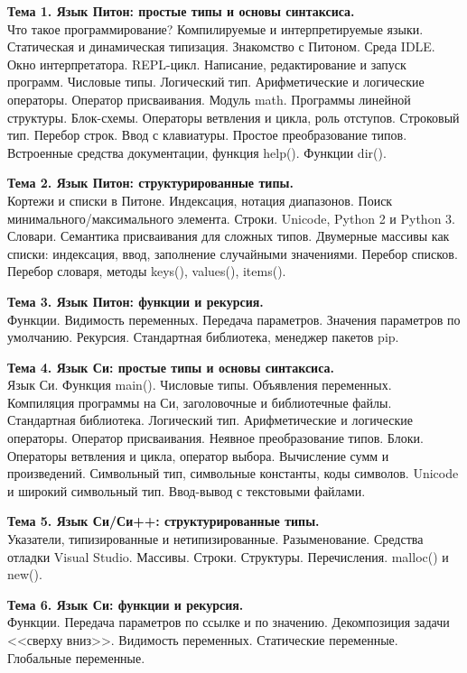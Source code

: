 \documentclass[a4paper,12pt]{article}
\begin{document}
\textbf{Тема 1. Язык Питон: простые типы и основы синтаксиса.}\\
Что такое программирование? Компилируемые и интерпретируемые языки. Статическая и динамическая типизация. Знакомство с Питоном. Среда IDLE. Окно интерпретатора. REPL-цикл. Написание, редактирование и запуск программ. Числовые типы. Логический тип. Арифметические и логические операторы. Оператор присваивания. Модуль math. Программы линейной структуры. Блок-схемы. Операторы ветвления и цикла, роль отступов. Строковый тип. Перебор строк. Ввод с клавиатуры. Простое преобразование типов. Встроенные средства документации, функция help(). Функции dir().

\textbf{Тема 2. Язык Питон: структурированные типы.          }\\
Кортежи и списки в Питоне. Индексация, нотация диапазонов. Поиск минимального/максимального элемента. Строки. Unicode, Python 2 и Python 3. Словари. Семантика присваивания для сложных типов. Двумерные массивы как списки: индексация, ввод, заполнение случайными значениями. Перебор списков. Перебор словаря, методы keys(), values(), items().

\textbf{Тема 3. Язык Питон: функции и рекурсия.	             }\\
Функции. Видимость переменных. Передача параметров. Значения параметров по умолчанию. Рекурсия. Стандартная библиотека, менеджер пакетов pip.

\textbf{Тема 4. Язык Си: простые типы и основы синтаксиса.   }\\
Язык Си. Функция main(). Числовые типы. Объявления переменных. Компиляция программы на Си, заголовочные и библиотечные файлы. Стандартная библиотека. Логический тип. Арифметические и логические операторы. Оператор присваивания. Неявное преобразование типов. Блоки. Операторы ветвления и цикла, оператор выбора. Вычисление сумм и произведений. Символьный тип, символьные константы, коды символов. Unicode и широкий символьный тип. Ввод-вывод с текстовыми файлами.

\textbf{Тема 5. Язык Си/Си++: структурированные типы.        }\\
Указатели, типизированные и нетипизированные. Разыменование. Средства отладки Visual Studio. Массивы. Строки. Структуры. Перечисления. malloc() и new().

\textbf{Тема 6. Язык Си: функции и рекурсия.	             }\\
Функции. Передача параметров по ссылке и по значению. Декомпозиция задачи <<сверху вниз>>. Видимость переменных. Статические переменные. Глобальные переменные.
\end{document}
